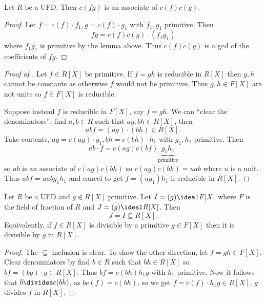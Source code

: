 \documentclass[a4paper]{article}
\theoremstyle{definition}
\begin{document}
\begin{corollary}
  Let \(R\) be a UFD. Then \(c(fg)\) is an associate of \(c(f)c(g)\).
\end{corollary}

\begin{proof}
  Let \(f = c(f) \cdot f_1, g = c(f) \cdot g_1\) with \(f_1, g_1\) primitive. Then
  \[
    fg = c(f)c(g) \cdot (f_1g_1)
  \]
  where \(f_1g_1\) is primitive by the lemma above. Thus \(c(f)c(g)\) is a gcd of the coefficients of \(fg\).
\end{proof}

\begin{proof}[Proof of ]
  Let \(f \in R[X]\) be primitive. If \(f = gh\) is reducible in \(R[X]\) then \(g, h\) cannot be constants as otherwise \(f\) would not be primitive. Thus \(g, h \in F[X]\) are not units so \(f \in F[X]\) is reducible.

  Suppose instead \(f\) is reducible in \(F[X]\), say \(f = gh\). We can ``clear the denominators'': find \(a, b \in R\) such that \(ag, bh \in R[X]\), then
  \[
    abf = (ag) \cdot (bh) \in R[X].
  \]
  Take contents, \(ag = c(ag) \cdot g_1, bh = c(bh) \cdot h_1\) with \(g_1, h_1\) primitive. Then
  \[
    ab \cdot f = c(ag)c(bf) \underbrace{g_1h_1}_{\text{primitive}}
  \]
  so \(ab\) is an associate of \(c(ag)c(bh)\) so \(c(ag)c(bh) = uab\) where \(u\) is a unit. Thus \(abf = uabg_1h_1\) and cancel to get \(f = (ug_1)h_1\) is reducible in \(R[X]\).
\end{proof}

\begin{definition}
  Let \(R\) be a UFD and \(g \in R[X]\) primitive. Let \(I = (g) \ideal F[X]\) where \(F\) is the field of fraction of \(R\) and \(J = (g) \ideal R[X]\). Then
  \[
    J = I \subseteq R[X].
  \]
  Equivalently, if \(f \in R[X]\) is divisible by a primitive \(g \in F[X]\) then it is divisible by \(g\) in \(R[X]\).
\end{definition}

\begin{proof}
  The \(\subseteq\) inclusion is clear. To show the other direction, let \(f = gh \in F[X]\). Clear denominators by find \(b \in R\) such that \(bh \in R[X]\) so \(bf = (bg) \cdot g \in R[X]\). Thus \(bf = c(bh)h_1g\) with \(h_1\) primitive. Now it follows that \(b \divides c(bh)\), as \(bc(f) = c(bh)\), so we get \(f = c(f) \cdot h_1g \in R[X]\). \(g\) divides \(f\) in \(R[X]\).
\end{proof}
\end{document}
